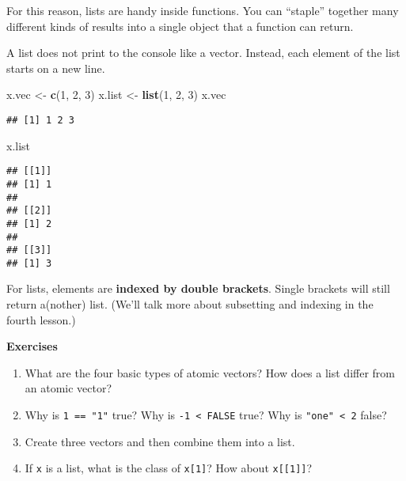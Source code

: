 \documentclass[
]{book}
\newenvironment{Shaded}{\begin{snugshade}}{\end{snugshade}}
\newcommand{\DecValTok}[1]{\textcolor[rgb]{0.00,0.00,0.81}{#1}}
\newcommand{\KeywordTok}[1]{\textcolor[rgb]{0.13,0.29,0.53}{\textbf{#1}}}
\newcommand{\NormalTok}[1]{#1}
\newcommand{\StringTok}[1]{\textcolor[rgb]{0.31,0.60,0.02}{#1}}
\begin{document}
For this reason, lists are handy inside functions. You can ``staple'' together many different kinds of results into a single object that a function can return.

A list does not print to the console like a vector. Instead, each element of the list starts on a new line.

\begin{Shaded}
\begin{Highlighting}[]
\NormalTok{x.vec \textless{}{-}}\StringTok{ }\KeywordTok{c}\NormalTok{(}\DecValTok{1}\NormalTok{, }\DecValTok{2}\NormalTok{, }\DecValTok{3}\NormalTok{)}
\NormalTok{x.list \textless{}{-}}\StringTok{ }\KeywordTok{list}\NormalTok{(}\DecValTok{1}\NormalTok{, }\DecValTok{2}\NormalTok{, }\DecValTok{3}\NormalTok{)}
\NormalTok{x.vec}
\end{Highlighting}
\end{Shaded}

\begin{verbatim}
## [1] 1 2 3
\end{verbatim}

\begin{Shaded}
\begin{Highlighting}[]
\NormalTok{x.list}
\end{Highlighting}
\end{Shaded}

\begin{verbatim}
## [[1]]
## [1] 1
## 
## [[2]]
## [1] 2
## 
## [[3]]
## [1] 3
\end{verbatim}

For lists, elements are \textbf{indexed by double brackets}. Single brackets will still return a(nother) list. (We'll talk more about subsetting and indexing in the fourth lesson.)

\textbf{Exercises}

\begin{enumerate}
\def\labelenumi{\arabic{enumi}.}
\item
  What are the four basic types of atomic vectors? How does a list differ from an atomic vector?
\item
  Why is \texttt{1\ ==\ "1"} true? Why is \texttt{-1\ \textless{}\ FALSE} true? Why is \texttt{"one"\ \textless{}\ 2} false?
\item
  Create three vectors and then combine them into a list.
\item
  If \texttt{x} is a list, what is the class of \texttt{x{[}1{]}}? How about \texttt{x{[}{[}1{]}{]}}?
\end{enumerate}
\end{document}
